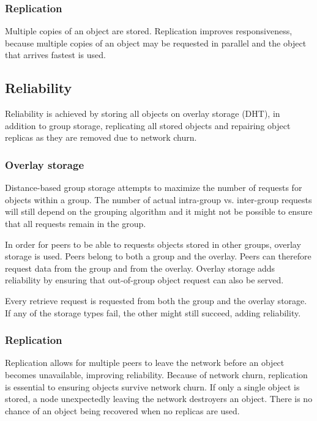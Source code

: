 \subsubsection{Replication}

Multiple copies of an object are stored. Replication improves responsiveness, because multiple copies of an object may be requested in parallel and the object that arrives fastest is used.

\subsection{Reliability}

Reliability is achieved by storing all objects on overlay storage (DHT), in addition to group storage, replicating all stored objects and repairing object replicas as they are removed due to network churn.

\subsubsection{Overlay storage}
Distance-based group storage attempts to maximize the number of requests for objects within a group. The number of actual intra-group vs. inter-group requests will still depend on the grouping algorithm and it might not be possible to ensure that all requests remain in the group.

In order for peers to be able to requests objects stored in other groups, overlay storage is used. Peers belong to both a group and the overlay. Peers can therefore request data from the group and from the overlay. Overlay storage adds reliability by ensuring that out-of-group object request can also be served.

Every retrieve request is requested from both the group and the overlay storage. If any of the storage types fail, the other might still succeed, adding reliability.

\subsubsection{Replication}

Replication allows for multiple peers to leave the network before an object becomes unavailable, improving reliability. Because of network churn, replication is essential to ensuring objects survive network churn. If only a single object is stored, a node unexpectedly leaving the network destroyers an object. There is no chance of an object being recovered when no replicas are used.

